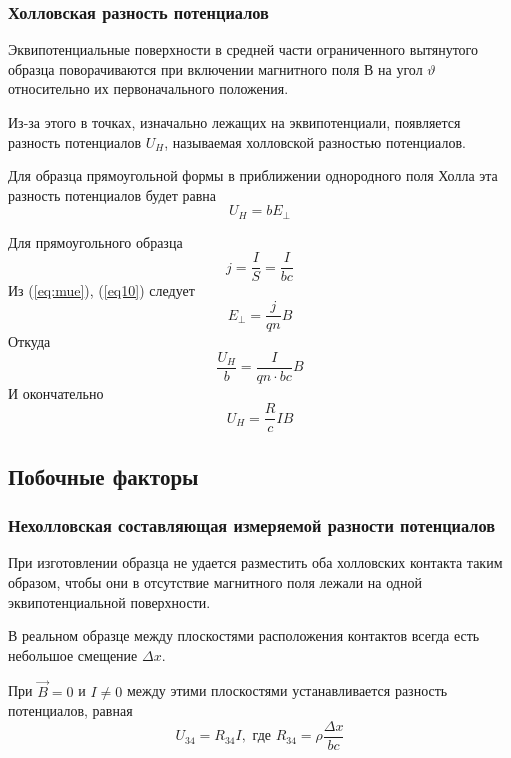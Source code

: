 \subsubsection{Холловская разность потенциалов}

Эквипотенциальные поверхности в средней части ограниченного вытянутого образца поворачиваются при включении магнитного поля В на угол $\vartheta$ относительно их первоначального положения.

Из-за этого в точках, изначально лежащих на эквипотенциали, появляется разность потенциалов $U_H$, называемая холловской разностью потенциалов.

Для образца прямоугольной формы в приближении однородного поля Холла эта разность потенциалов будет равна 
\begin{equation}
	U_H=bE_\perp
\end{equation}

Для прямоугольного образца
\begin{equation}
	j=\frac{I}{S}=\frac{I}{bc}
\end{equation}
Из (\ref{eq:mue}), (\ref{eq10}) следует
\begin{equation}
	{E}_\perp=\frac{j}{qn}B
\end{equation}
Откуда
\begin{equation}
	\frac{U_H}{b}=\frac{I}{qn\cdot bc}B
\end{equation}
И окончательно
\begin{equation}
	U_H=\frac{R}{c}IB
\end{equation}

\subsection{Побочные факторы}
\subsubsection{Нехолловская составляющая измеряемой разности потенциалов}

При изготовлении образца не удается разместить оба холловских контакта таким образом, чтобы они в отсутствие магнитного поля лежали на одной эквипотенциальной поверхности. 

В реальном образце между плоскостями расположения контактов всегда есть небольшое смещение $\Delta x$. 

При $\vec{B}=0$ и $I\ne0$ между этими плоскостями устанавливается разность потенциалов, равная 
\begin{equation}
	U_{34}=R_{34}I,
	\text{  где  }
	R_{34}=\rho\frac{\Delta x}{bc}
\end{equation}

